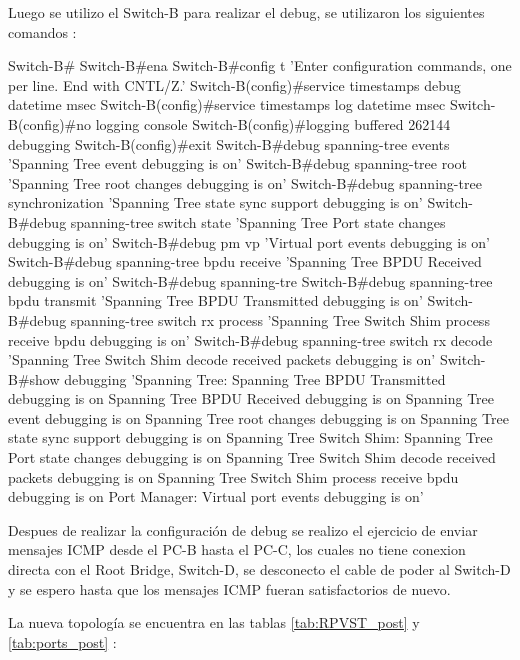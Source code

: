 Luego se utilizo el Switch-B para realizar el debug, se utilizaron los siguientes comandos :
\begin{darkcode}
Switch-B#
Switch-B#ena
Switch-B#config t
'Enter configuration commands, one per line.  End with CNTL/Z.'
Switch-B(config)#service timestamps debug datetime msec
Switch-B(config)#service timestamps log datetime msec
Switch-B(config)#no logging console
Switch-B(config)#logging buffered 262144 debugging
Switch-B(config)#exit  
Switch-B#debug spanning-tree events
'Spanning Tree event debugging is on'
Switch-B#debug spanning-tree root
'Spanning Tree root changes debugging is on'
Switch-B#debug spanning-tree synchronization
'Spanning Tree state sync support debugging is on'
Switch-B#debug spanning-tree switch state
'Spanning Tree Port state changes debugging is on'
Switch-B#debug pm vp
'Virtual port events debugging is on'
Switch-B#debug spanning-tree bpdu receive 
'Spanning Tree BPDU Received debugging is on'
Switch-B#debug spanning-tre
Switch-B#debug spanning-tree bpdu transmit
'Spanning Tree BPDU Transmitted debugging is on'
Switch-B#debug spanning-tree switch rx process
'Spanning Tree Switch Shim process receive bpdu debugging is on'
Switch-B#debug spanning-tree switch rx decode
'Spanning Tree Switch Shim decode received packets debugging is on'
Switch-B#show debugging
'Spanning Tree:
  Spanning Tree BPDU Transmitted debugging is on
  Spanning Tree BPDU Received debugging is on
  Spanning Tree event debugging is on
  Spanning Tree root changes debugging is on
  Spanning Tree state sync support debugging is on
Spanning Tree Switch Shim:
  Spanning Tree Port state changes debugging is on
  Spanning Tree Switch Shim decode received packets debugging is on
  Spanning Tree Switch Shim process receive bpdu debugging is on
Port Manager:
  Virtual port events debugging is on'
\end{darkcode}

Despues de realizar la configuración de debug se realizo el ejercicio de enviar mensajes ICMP desde el PC-B hasta
el PC-C, los cuales no tiene conexion directa con el Root Bridge, Switch-D, se desconecto el cable de poder al 
Switch-D y se espero hasta que los mensajes ICMP fueran satisfactorios de nuevo.

La nueva topología se encuentra en las tablas \ref{tab:RPVST_post} y \ref{tab:ports_post} :

